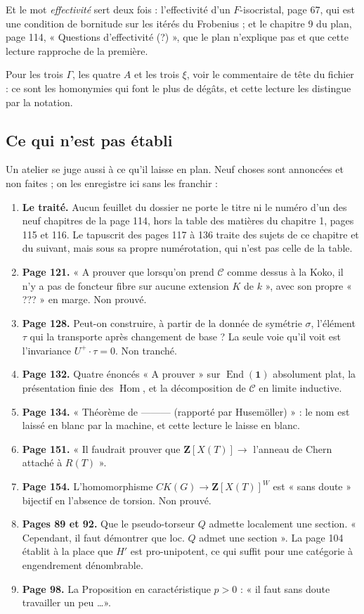 \documentclass[11pt,a4paper]{article}
\begin{document}
Et le mot \emph{effectivité} sert deux fois : l'effectivité d'un
$F$-isocristal, page 67, qui est une condition de bornitude sur les itérés du
Frobenius ; et le chapitre 9 du plan, page 114, « Questions d'effectivité (?) »,
que le plan n'explique pas et que cette lecture rapproche de la première.

Pour les trois $\Gamma$, les quatre $A$ et les trois $\xi$, voir le
commentaire de tête du fichier : ce sont les homonymies qui font le plus de
dégâts, et cette lecture les distingue par la notation.

\subsection*{Ce qui n'est pas établi}

Un atelier se juge aussi à ce qu'il laisse en plan. Neuf choses sont
annoncées et non faites ; on les enregistre ici sans les franchir :

\begin{enumerate}
\item \textbf{Le traité.} Aucun feuillet du dossier ne porte le titre ni le
numéro d'un des neuf chapitres de la page 114, hors la table des matières du
chapitre 1, pages 115 et 116. Le tapuscrit des pages 117 à 136 traite des
sujets de ce chapitre et du suivant, mais sous sa propre numérotation, qui
n'est pas celle de la table.
\item \textbf{Page 121.} « A prouver que lorsqu'on prend $\mathcal{C}$ comme
dessus à la Koko, il n'y a pas de foncteur fibre sur aucune extension $K$ de
$k$ », avec son propre « ??? » en marge. Non prouvé.
\item \textbf{Page 128.} Peut-on construire, à partir de la donnée de symétrie
$\sigma$, l'élément $\tau$ qui la transporte après changement de base ? La
seule voie qu'il voit est l'invariance $U^{+}\!\cdot\tau = 0$. Non tranché.
\item \textbf{Page 132.} Quatre énoncés « A prouver » sur
$\operatorname{End}(\mathbf{1})$ absolument plat, la présentation finie des
$\operatorname{Hom}$, et la décomposition de $\mathcal{C}$ en limite inductive.
\item \textbf{Page 134.} « Théorème de ——— (rapporté par Husemöller) » : le nom
est laissé en blanc par la machine, et cette lecture le laisse en blanc.
\item \textbf{Page 151.} « Il faudrait prouver que $\mathbf{Z}[X(T)] \to$
l'anneau de Chern attaché à $R(T)$ ».
\item \textbf{Page 154.} L'homomorphisme $CK(G) \to \mathbf{Z}[X(T)]^{W}$ est
« sans doute » bijectif en l'absence de torsion. Non prouvé.
\item \textbf{Pages 89 et 92.} Que le pseudo-torseur $Q$ admette localement une
section. « Cependant, il faut démontrer que loc. $Q$ admet une section ». La
page 104 établit à la place que $H'$ est pro-unipotent, ce qui suffit pour une
catégorie à engendrement dénombrable.
\item \textbf{Page 98.} La Proposition en caractéristique $p > 0$ : « il faut
sans doute travailler un peu \ldots ».
\end{enumerate}
\end{document}
